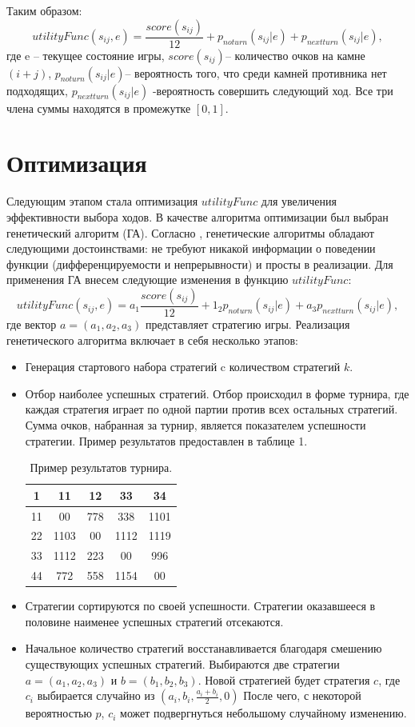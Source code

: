 \documentclass[11pt]{article}
\begin{document}
Таким образом:
\[utilityFunc(s_{ij},e)=\frac{score(s_{ij})}{12}+p_{noturn}(s_{ij}|e)+p_{nextturn}(s_{ij}|e),\] где e – текущее состояние игры, $score(s_{ij})$– количество очков на камне $(i+j)$, $p_{noturn}(s_{ij}|e)$– вероятность того, что среди камней противника нет подходящих, $p_{nextturn}(s_{ij}|e)$ -вероятность совершить следующий ход. Все три члена суммы находятся в промежутке $[0,1]$.

\section{Оптимизация}
Следующим этапом стала оптимизация $utilityFunc$ для увеличения эффективности выбора ходов. В качестве алгоритма оптимизации был выбран генетический алгоритм (ГА). Согласно \cite{bib1}, генетические алгоритмы обладают следующими достоинствами: не требуют никакой информации о поведении функции (дифференцируемости и непрерывности) и просты в реализации.
Для применения ГА внесем следующие изменения в функцию $utilityFunc$:
\[utilityFunc(s_{ij},e)=a_1 \frac{score(s_{ij})}{12}+1_2p_{noturn}(s_{ij}|e)+a_3p_{nextturn}(s_{ij}|e),\] где вектор $a = (a_1, a_2, a_3)$ представляет стратегию игры.
Реализация генетического алгоритма включает в себя несколько этапов: 
\begin{itemize}
    \item Генерация стартового набора стратегий c количеством стратегий $k$.
    \item Отбор наиболее успешных стратегий. Отбор происходил в форме турнира, где каждая стратегия играет по одной партии против всех остальных стратегий. Сумма очков, набранная за турнир, является показателем успешности стратегии. Пример результатов предоставлен в таблице 1.
    \begin{table}[h!]\begin{center}\caption{Пример результатов турнира.}
        \begin{tabular}{|c|c|c|c|c|}\hline
          1 & 11 & 12 & 33 & 34 \\ \hline 
          11 & 00 & 778 & 338 & 1101 \\ \hline
          22 & 1103 & 00 & 1112 & 1119 \\ \hline
          33 & 1112 & 223 & 00 & 996 \\ \hline
          44 & 772 & 558 & 1154 & 00 \\ \hline
        \end{tabular}\label{tab:result example}
        \end{center}\end{table}
\item Стратегии сортируются по своей успешности. Стратегии оказавшееся в половине наименее успешных стратегий отсекаются.
\item Начальное количество стратегий восстанавливается благодаря смешению существующих успешных стратегий. Выбираются две стратегии $a=(a_1,a_2,a_3)$ и $b=(b_1,b_2,b_3)$. Новой стратегией будет стратегия $c$, где $c_i$  выбирается случайно из $(a_i,b_i,\frac{a_i+b_i}{2},0)$ После чего, с некоторой вероятностью $p$, $c_i$ может подвергнуться небольшому случайному изменению.
\end{itemize}
\end{document}

